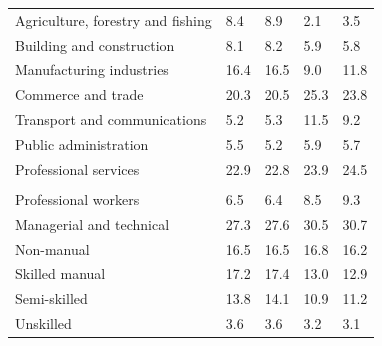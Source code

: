 \documentclass{article}
\begin{document}
\begin{table}[h]
\begin{tabular}{KTTTT}
    \hline
Agriculture, forestry and fishing  & 8.4& 8.9& 2.1& 3.5\\
Building and construction & 8.1& 8.2& 5.9& 5.8\\
Manufacturing industries & 16.4& 16.5&  9.0& 11.8\\
Commerce and trade  & 20.3& 20.5& 25.3& 23.8\\
Transport and communications  &  5.2&  5.3& 11.5&  9.2\\
Public administration & 5.5& 5.2& 5.9& 5.7\\
Professional services & 22.9& 22.8& 23.9& 24.5\\
\hline
    \\ 
    \hline
Professional workers  & 6.5& 6.4 & 8.5& 9.3\\
Managerial and technical & 27.3& 27.6& 30.5& 30.7\\
Non-manual & 16.5& 16.5& 16.8& 16.2\\
Skilled manual & 17.2& 17.4& 13.0& 12.9\\
Semi-skilled & 13.8& 14.1& 10.9& 11.2\\
Unskilled  & 3.6& 3.6& 3.2& 3.1\\
\end{tabular}
\end{table}
\pagebreak
\end{document}
